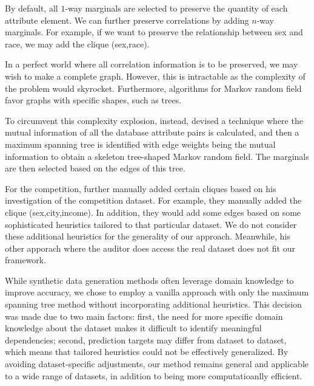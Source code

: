 \documentclass[manuscript,screen,review,anonymous]{acmart}
\begin{document}
By default, all $1$-way marginals are selected to preserve the quantity of each attribute element. We can further preserve correlations by adding $n$-way marginals. For example, if we want to preserve the relationship between sex and race, we may add the clique (sex,race).

In a perfect world where all correlation information is to be preserved, we may wish to make a complete graph. However, this is intractable as the complexity of the problem would skyrocket. Furthermore, algorithms for Markov random field favor graphs with specific shapes, such as trees.

To circumvent this complexity explosion, instead, \cite{mckenna2021winning} devised a technique where the mutual information of all the database attribute pairs is calculated, and then a maximum spanning tree is identified with edge weights being the mutual information to obtain a skeleton tree-shaped Markov random field. The marginals are then selected based on the edges of this tree.

For the competition, \cite{mckenna2021winning} further manually added certain cliques based on his investigation of the competition dataset. For example, they manually added the clique (sex,city,income). In addition, they would add some edges based on some sophisticated heuristics tailored to that particular dataset. We do not consider these additional heuristics for the generality of our approach. Meanwhile, his other apporach where the auditor does access the real dataset does not fit our framework.

While synthetic data generation methods often leverage domain knowledge to improve accuracy, we chose to employ a vanilla approach with only the maximum spanning tree method without incorporating additional heuristics. This decision was made due to two main factors: first, the need for more specific domain knowledge about the dataset makes it difficult to identify meaningful dependencies; second, prediction targets may differ from dataset to dataset, which means that tailored heuristics could not be effectively generalized. By avoiding dataset-specific adjustments, our method remains general and applicable to a wide range of datasets, in addition to being more computatioanlly efficient.

\end{document}
